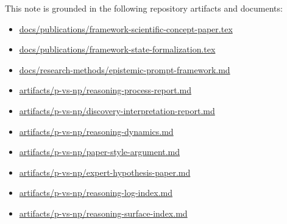 \documentclass[11pt]{article}
\begin{document}
This note is grounded in the following repository artifacts and documents:

\begin{itemize}[leftmargin=*,itemsep=0.2em]
\item \url{docs/publications/framework-scientific-concept-paper.tex}
\item \url{docs/publications/framework-state-formalization.tex}
\item \url{docs/research-methods/epistemic-prompt-framework.md}
\item \url{artifacts/p-vs-np/reasoning-process-report.md}
\item \url{artifacts/p-vs-np/discovery-interpretation-report.md}
\item \url{artifacts/p-vs-np/reasoning-dynamics.md}
\item \url{artifacts/p-vs-np/paper-style-argument.md}
\item \url{artifacts/p-vs-np/expert-hypothesis-paper.md}
\item \url{artifacts/p-vs-np/reasoning-log-index.md}
\item \url{artifacts/p-vs-np/reasoning-surface-index.md}
\end{itemize}
\end{document}
